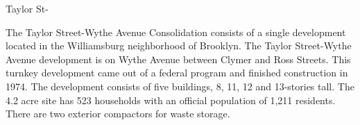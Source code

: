 Taylor St-

The Taylor Street-Wythe Avenue Consolidation consists of a single development located in the Williamsburg neighborhood of Brooklyn. The Taylor Street-Wythe Avenue development is on Wythe Avenue between Clymer and Ross Streets. This turnkey development came out of a federal program and finished construction in 1974. The development consists of five buildings, 8, 11, 12 and 13-stories tall. The 4.2 acre site has 523 households with an official population of 1,211 residents. There are two exterior compactors for waste storage.